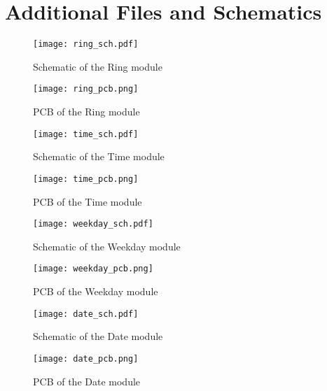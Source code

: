 \chapter{Additional Files and Schematics}

\begin{figure}[h!]
	\centering
	\texttt{[image: ring\_sch.pdf]}
	\caption{Schematic of the Ring module}
	\label{fig:ring_sch}
\end{figure}

\begin{figure}[h!]
	\centering
	\texttt{[image: ring\_pcb.png]}
	\caption{PCB of the Ring module}
	\label{fig:ring_pcb}
\end{figure}
\begin{figure}[h!]
	\centering
	\texttt{[image: time\_sch.pdf]}
	\caption{Schematic of the Time module}
	\label{fig:time_sch}
\end{figure}

\begin{figure}[h!]
	\centering
	\texttt{[image: time\_pcb.png]}
	\caption{PCB of the Time module}
	\label{fig:time_pcb}
\end{figure}
\begin{figure}[h!]
	\centering
	\texttt{[image: weekday\_sch.pdf]}
	\caption{Schematic of the Weekday module}
	\label{fig:weekday_sch}
\end{figure}

\begin{figure}[h!]
	\centering
	\texttt{[image: weekday\_pcb.png]}
	\caption{PCB of the Weekday module}
	\label{fig:weekday_pcb}
\end{figure}
\begin{figure}[h!]
	\centering
	\texttt{[image: date\_sch.pdf]}
	\caption{Schematic of the Date module}
	\label{fig:date_sch}
\end{figure}

\begin{figure}[h!]
	\centering
	\texttt{[image: date\_pcb.png]}
	\caption{PCB of the Date module}
	\label{fig:date_pcb}
\end{figure}
